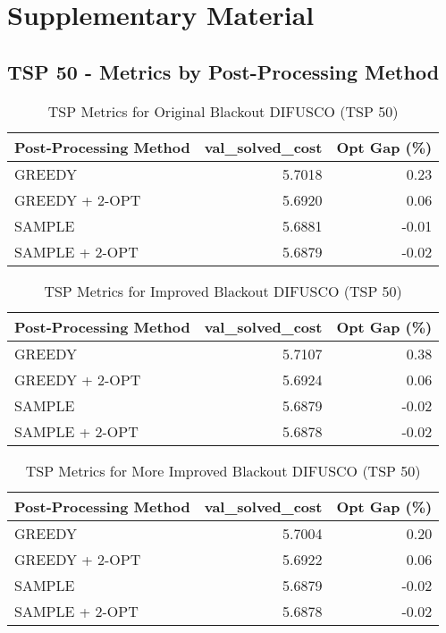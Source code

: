 \clearpage

\setcounter{page}{1}
\section*{Supplementary Material}

\subsection*{TSP 50 - Metrics by Post-Processing Method}

\begin{table}[H]
    \centering
    \caption{TSP Metrics for Original Blackout DIFUSCO (TSP 50)}
    \begin{tabular}{lrr}
        \toprule
        Post-Processing Method & val\_solved\_cost & Opt Gap (\%) \\
        \midrule
        GREEDY                 & 5.7018 & 0.23 \\
        GREEDY + 2-OPT         & 5.6920 & 0.06 \\
        SAMPLE                 & 5.6881 & -0.01 \\
        SAMPLE + 2-OPT         & 5.6879 & -0.02 \\
        \bottomrule
    \end{tabular}
\end{table}

\begin{table}[H]
    \centering
    \caption{TSP Metrics for Improved Blackout DIFUSCO (TSP 50)}
    \begin{tabular}{lrr}
        \toprule
        Post-Processing Method & val\_solved\_cost & Opt Gap (\%) \\
        \midrule
        GREEDY                 & 5.7107 & 0.38 \\
        GREEDY + 2-OPT         & 5.6924 & 0.06 \\
        SAMPLE                 & 5.6879 & -0.02 \\
        SAMPLE + 2-OPT         & 5.6878 & -0.02 \\
        \bottomrule
    \end{tabular}
\end{table}

\begin{table}[H]
    \centering
    \caption{TSP Metrics for More Improved Blackout DIFUSCO (TSP 50)}
    \begin{tabular}{lrr}
        \toprule
        Post-Processing Method & val\_solved\_cost & Opt Gap (\%) \\
        \midrule
        GREEDY                 & 5.7004 & 0.20 \\
        GREEDY + 2-OPT         & 5.6922 & 0.06 \\
        SAMPLE                 & 5.6879 & -0.02 \\
        SAMPLE + 2-OPT         & 5.6878 & -0.02 \\
        \bottomrule
    \end{tabular}
\end{table}



